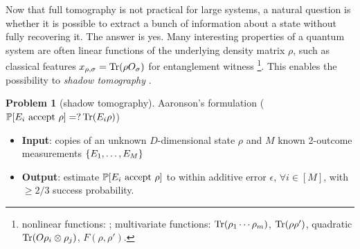 \documentclass[
aps,
pra,
twocolumn,
floatfix,
]{revtex4-2}
\theoremstyle{plain}
\theoremstyle{definition}
\newtheorem{problem}{Problem}
\newcommand{\ob}{O}
\newcommand{\pob}{O}
\newcommand{\dm}{\rho}
\begin{document}
Now that full tomography is not practical for large systems, a natural question is whether it is possible to extract a bunch of information about a state without fully recovering it.
The answer is yes.
Many interesting properties of a quantum system are often linear functions of the underlying density matrix $\dm$, such as classical features $x_{\dm,\sigma}=\Tr(\dm\pob_{\sigma}) $ for entanglement witness
\footnote{nonlinear functions: ;
multivariate functions:  $\Tr(\dm_1 \cdots \dm_m)$,  $\Tr(\dm\dm')$,  quadratic $\Tr(\ob \dm_i \otimes \dm_j)$,  $F(\dm,\dm')$.}.
This enables the possibility to \emph{shadow tomography} \cite{aaronsonShadowTomographyQuantum2018}.
\begin{problem}[shadow tomography]\label{prm:shadow_tomography}
	Aaronson's formulation	
	($\probability[E_i \text{ accept } \dm]=?\Tr(E_i \dm)$)
	\begin{itemize}
		\item \textbf{Input}: copies of an unknown $D$-dimensional state $\rho$ and $M$ known 2-outcome measurements $\qty{E_1,\dots,E_M}$
		\item \textbf{Output}: estimate $\probability[E_i \text{ accept } \dm]$ to within additive error $\epsilon$, $\forall i\in [M]$, with $\ge 2/3$ success probability.	
	\end{itemize}
\end{problem}
\end{document}

